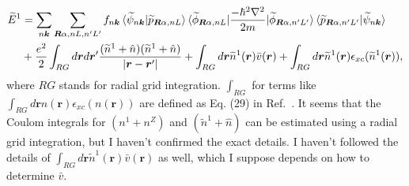 \documentclass{article}
\begin{document}
\begin{align} 
  \widetilde{E}^1 &= 
  \sum_{n\bm{k}} \sum_{\bm{R}\alpha, nL, n'L'}f_{n\bm{k}} 
  \braket{\widetilde{\psi}_{n\bm{k}} | \widetilde{p}_{\bm{R}\alpha, nL}}
  \braket{\widetilde{\phi}_{\bm{R}\alpha, nL}| \frac{-\hbar^2\nabla^2}{2m} |\widetilde{\phi}_{\bm{R}\alpha, n'L'}}
  \braket{\widetilde{p}_{\bm{R}\alpha, n'L'}|\widetilde{\psi}_{n\bm{k}} }
  \nonumber\\&
  + \frac{e^2}{2}\int_{RG} d\bm{r}d\bm{r}' \frac{(\widetilde{n}^1 + \hat{n})(\widetilde{n}^1 + \hat{n})}{|\bm{r}-\bm{r}'|}
  + \int_{RG} d\bm{r} \widetilde{n}^1(\bm{r})\bar{v}(\bm{r})
  + \int_{RG} d\bm{r} \widetilde{n}^1(\bm{r})\epsilon_{xc}(\widetilde{n}^1(\bm{r})),
\end{align}
where $RG$ stands for radial grid integration. $\int_{RG}$ for terms like $\int_{RG} d\bm{r} n(\bm{r})\epsilon_{xc}(n(\bm{r}))$ are defined as Eq. (29) in Ref.~\cite{PhysRevB.50.17953}. 
It seems that the Coulom integrals for $({n}^1 + n^Z)$ and $(\widetilde{n}^1 + \hat{n})$ can be estimated using a radial grid integration, but I haven't confirmed the exact details.  
I haven't followed the details of $\int_{RG} d\bm{r} \widetilde{n}^1(\bm{r})\bar{v}(\bm{r})$ as well, which I suppose depends on how to determine $\bar{v}$.



\end{document}
